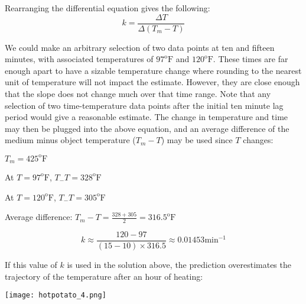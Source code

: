 \documentclass{ximera}
\begin{document}
Rearranging the differential equation gives the following:
\[
k=\frac{\Delta T}{\Delta(T_m-T)}
\]
 
We could make an arbitrary selection of two data points at ten and fifteen minutes, with associated temperatures of $97^{\text{o}}\text{F}$ and $120^{\text{o}}\text{F}$.  These times are far enough apart to have a sizable temperature change where rounding to the nearest unit of temperature will not impact the estimate.  However, they are close enough that the slope does not change much over that time range.  Note that any selection of two time-temperature data points after the initial ten minute lag period would give a reasonable estimate.  The change in temperature and time may then be plugged into the above equation, and an average difference of the medium minus object temperature ($T_m-T$) may be used since $T$ changes:
\begin{center}
$T_m=425^{\text{o}}\text{F}$
 
At $T=97^{\text{o}}\text{F}$, $T_-T=328^{\text{o}}\text{F}$
 
At $T=120^{\text{o}}\text{F}$, $T_-T=305^{\text{o}}\text{F}$
 
Average difference: $T_m-T=\frac{328+305}{2}=316.5^{\text{o}}\text{F}$
\end{center}
\[
k\approx\frac{120-97}{(15-10)\times316.5}\approx 0.01453\text{min}^{-1}
\]
 
If this value of $k$ is used in the solution above, the prediction overestimates the trajectory of the temperature after an hour of heating:
 
\begin{image}
\texttt{[image: hotpotato\_4.png]}
\end{image}
 
\end{document}
